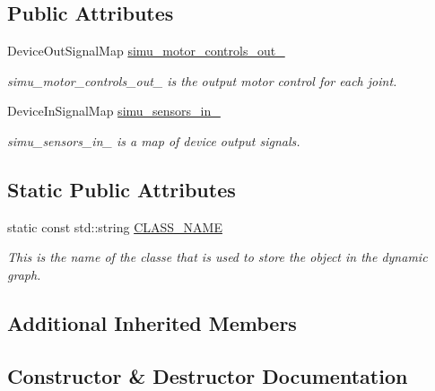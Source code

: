 \subsection*{Public Attributes}
\begin{DoxyCompactItemize}
\item 
Device\+Out\+Signal\+Map \hyperlink{classdynamic__graph_1_1DeviceSimulator_abbbcc26f173788b15a395ff87f3925e1}{simu\+\_\+motor\+\_\+controls\+\_\+out\+\_\+}
\begin{DoxyCompactList}\small\item\em simu\+\_\+motor\+\_\+controls\+\_\+out\+\_\+ is the output motor control for each joint. \end{DoxyCompactList}\item 
Device\+In\+Signal\+Map \hyperlink{classdynamic__graph_1_1DeviceSimulator_a8640ee078f06fc5f31efcb2b35c9ed99}{simu\+\_\+sensors\+\_\+in\+\_\+}
\begin{DoxyCompactList}\small\item\em simu\+\_\+sensors\+\_\+in\+\_\+ is a map of device output signals. \end{DoxyCompactList}\end{DoxyCompactItemize}
\subsection*{Static Public Attributes}
\begin{DoxyCompactItemize}
\item 
\mbox{\label{classdynamic__graph_1_1DeviceSimulator_a4f28a1f4a96bdf5a2adf1e1f15a8ab77}} 
static const std\+::string \hyperlink{classdynamic__graph_1_1DeviceSimulator_a4f28a1f4a96bdf5a2adf1e1f15a8ab77}{C\+L\+A\+S\+S\+\_\+\+N\+A\+ME}
\begin{DoxyCompactList}\small\item\em This is the name of the classe that is used to store the object in the dynamic graph. \end{DoxyCompactList}\end{DoxyCompactItemize}
\subsection*{Additional Inherited Members}


\subsection{Constructor \& Destructor Documentation}
\mbox{\label{classdynamic__graph_1_1DeviceSimulator_ad1c52d0a4bfa4617c7653532570a2c90}} 
